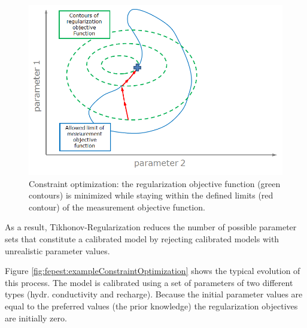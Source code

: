 \begin{figure}
	\center
	\includegraphics[width=\columnwidth]{figures/constraintOptimization.png}
\caption{Constraint optimization: the regularization objective function (green contours) is minimized while staying within the defined limits (red contour) of the measurement objective function.}
\label{fig:fepest:constraintOptimization}
\end{figure}

As a result, Tikhonov-Regularization reduces the number of possible parameter sets that constitute a calibrated model by rejecting calibrated models with unrealistic parameter values.

Figure \ref{fig:fepest:exampleConstraintOptimization} shows the typical evolution of this process. The model is calibrated using a set of parameters of two different types (hydr. conductivity and recharge). Because the initial parameter values are equal to the preferred values (the prior knowledge) the regularization objectives are initially zero.

